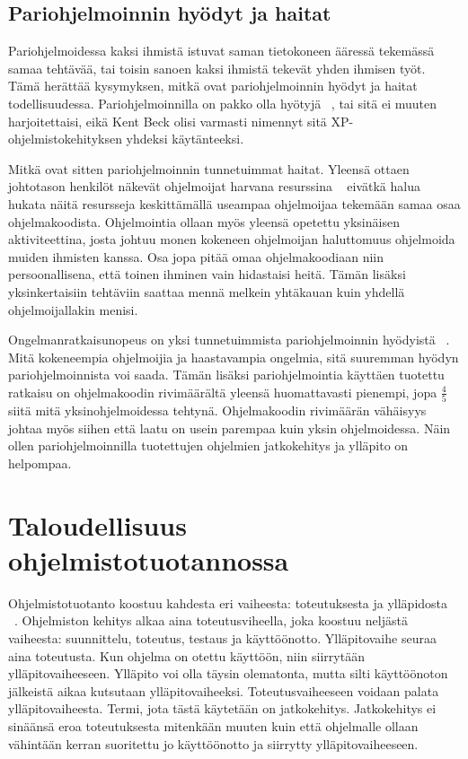 \documentclass[finnish]{tktltiki2}
\theoremstyle{definition}
\theoremstyle{remark}
\begin{document}
\subsection{Pariohjelmoinnin hyödyt ja haitat}

Pariohjelmoidessa kaksi ihmistä istuvat saman tietokoneen ääressä tekemässä samaa tehtävää, tai toisin sanoen kaksi ihmistä tekevät yhden ihmisen työt. Tämä herättää kysymyksen, mitkä ovat pariohjelmoinnin hyödyt ja haitat todellisuudessa. Pariohjelmoinnilla on pakko olla hyötyjä  ~\cite{costandbenefit}, tai sitä ei muuten harjoitettaisi, eikä Kent Beck olisi varmasti nimennyt sitä XP-ohjelmistokehityksen yhdeksi käytänteeksi.

Mitkä ovat sitten pariohjelmoinnin tunnetuimmat haitat. Yleensä ottaen johtotason henkilöt näkevät ohjelmoijat harvana resurssina ~\cite{costandbenefit2} eivätkä halua hukata näitä resursseja keskittämällä useampaa ohjelmoijaa tekemään samaa osaa ohjelmakoodista. Ohjelmointia ollaan myös yleensä opetettu yksinäisen aktiviteettina, josta johtuu monen kokeneen ohjelmoijan haluttomuus ohjelmoida muiden ihmisten kanssa. Osa jopa pitää omaa ohjelmakoodiaan niin persoonallisena, että toinen ihminen vain hidastaisi heitä. Tämän lisäksi yksinkertaisiin tehtäviin saattaa mennä melkein yhtäkauan kuin yhdellä ohjelmoijallakin menisi.

Ongelmanratkaisunopeus on yksi tunnetuimmista pariohjelmoinnin hyödyistä ~\cite{costandbenefit2}. Mitä kokeneempia ohjelmoijia ja haastavampia ongelmia, sitä suuremman hyödyn pariohjelmoinnista voi saada. Tämän lisäksi pariohjelmointia käyttäen tuotettu ratkaisu on ohjelmakoodin rivimäärältä yleensä huomattavasti pienempi, jopa $\frac{4}{5}$ siitä mitä yksinohjelmoidessa tehtynä. Ohjelmakoodin rivimäärän vähäisyys johtaa myös siihen että laatu on usein parempaa kuin yksin ohjelmoidessa. Näin ollen pariohjelmoinnilla tuotettujen ohjelmien jatkokehitys ja ylläpito on helpompaa.


\section{Taloudellisuus ohjelmistotuotannossa}

Ohjelmistotuotanto koostuu kahdesta eri vaiheesta: toteutuksesta ja ylläpidosta ~\cite{sommerville1998requirements}. Ohjelmiston kehitys alkaa aina toteutusviheella, joka koostuu neljästä vaiheesta: suunnittelu, toteutus, testaus ja käyttöönotto. Ylläpitovaihe seuraa aina toteutusta. Kun ohjelma on otettu käyttöön, niin siirrytään ylläpitovaiheeseen. Ylläpito voi olla täysin olematonta, mutta silti käyttöönoton jälkeistä aikaa kutsutaan ylläpitovaiheeksi. Toteutusvaiheeseen voidaan palata ylläpitovaiheesta. Termi, jota tästä käytetään on jatkokehitys. Jatkokehitys ei sinäänsä eroa toteutuksesta mitenkään muuten kuin että ohjelmalle ollaan vähintään kerran suoritettu jo käyttöönotto ja siirrytty ylläpitovaiheeseen.
\end{document}
